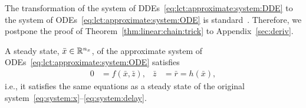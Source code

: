 %
The transformation of the system of DDEs~\eqref{eq:lct:approximate:system:DDE} to the system of ODEs~\eqref{eq:lct:approximate:system:ODE} is standard~\cite{MacDonald:1978, Ponosov:etal:2004}. Therefore, we postpone the proof of Theorem~\ref{thm:linear:chain:trick} to Appendix~\ref{sec:deriv}.
%
\begin{theorem}\label{thm:lct:approximate:system:ODE:steady:state}
	A steady state, $\bar x \in \mathbb{R}^{n_x}$, of the approximate system of ODEs~\eqref{eq:lct:approximate:system:ODE} satisfies
	\begin{align}\label{eq:lct:steady:state}
		0 &= f(\bar x, \bar z), & \bar z &= \bar r = h(\bar x),
	\end{align}
	i.e., it satisfies the same equations as a steady state of the original system~\eqref{eq:system:x}--\eqref{eq:system:delay}.
\end{theorem}
%
